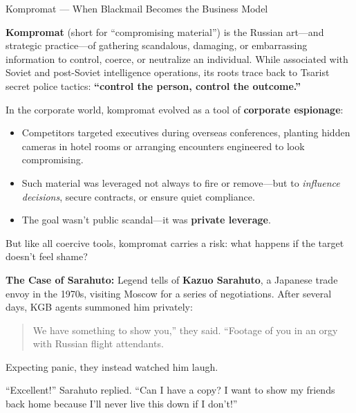 \begin{HistoricalSidebar}{Kompromat --- When Blackmail Becomes the Business Model}

    \textbf{Kompromat} (short for “compromising material”) is the Russian art—and strategic practice—of gathering scandalous, damaging, or embarrassing information to control, coerce, or neutralize an individual.  
    While associated with Soviet and post-Soviet intelligence operations, its roots trace back to Tsarist secret police tactics: \textbf{“control the person, control the outcome.”}
    
    \medskip
    
    In the corporate world, kompromat evolved as a tool of \textbf{corporate espionage}:  

    \medskip

    \begin{itemize}
        \item Competitors targeted executives during overseas conferences, planting hidden cameras in hotel rooms or arranging encounters engineered to look compromising.
        \item Such material was leveraged not always to fire or remove—but to \emph{influence decisions}, secure contracts, or ensure quiet compliance.
        \item The goal wasn’t public scandal—it was \textbf{private leverage}.
    \end{itemize}
    
    \medskip
    
    But like all coercive tools, kompromat carries a risk: what happens if the target doesn’t feel shame?
    
    \medskip
    
    \textbf{The Case of Sarahuto:}  
    Legend tells of \textbf{Kazuo Sarahuto}, a Japanese trade envoy in the 1970s, visiting Moscow for a series of negotiations.  
    After several days, KGB agents summoned him privately:
    
    \begin{quote}
    We have something to show you,” they said. “Footage of you in an orgy with Russian flight attendants.
    \end{quote}
    
    Expecting panic, they instead watched him laugh.
    
    \medskip
    
    “Excellent!” Sarahuto replied. “Can I have a copy? I want to show my friends back home because I’ll never live this down if I don’t!”
    

\end{HistoricalSidebar}
